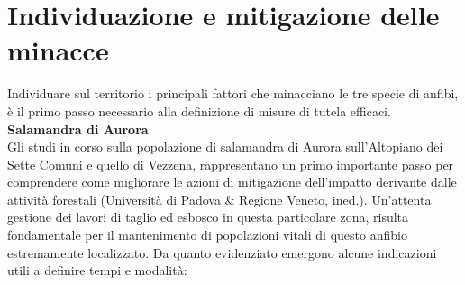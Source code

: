 \documentclass[10pt,twoside,openany,x11names,svgnames,italian,a5paper,dvipsnames,table]{memoir}
\begin{document}
\section{Individuazione e mitigazione delle minacce}
Individuare sul territorio i principali fattori che minacciano le tre specie di anfibi, è il primo passo necessario alla definizione di misure di tutela efficaci. \\

\vspace{.2cm}
\textbf{\noindent Salamandra di Aurora} \\
Gli studi in corso sulla popolazione di salamandra di Aurora sull’Altopiano dei Sette Comuni e quello di Vezzena, rappresentano un primo importante passo per comprendere come migliorare le azioni di mitigazione dell’impatto derivante dalle attività forestali (Università di Padova & Regione Veneto, ined.). Un’attenta gestione dei lavori di taglio ed esbosco in questa particolare zona, risulta fondamentale per il mantenimento di popolazioni vitali di questo anfibio estremamente localizzato.
Da quanto evidenziato emergono alcune indicazioni utili a definire tempi e modalità:
\end{document}
